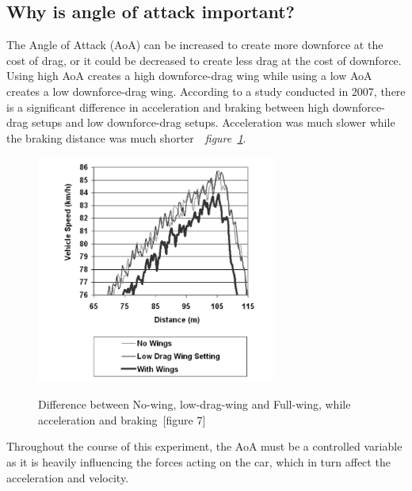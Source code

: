 \documentclass[11pt, a4paper]{article}
\begin{document}
\subsection{Why is angle of attack important?}
The Angle of Attack (AoA) can be increased to create more downforce at the cost of drag, or it could be decreased to create less drag at the cost of downforce. Using high AoA creates a high downforce-drag wing while using a low AoA creates a low downforce-drag wing.
According to a study conducted in 2007\cite{SAE}, there is a significant difference in acceleration and braking between high downforce-drag setups and low downforce-drag setups.
Acceleration was much slower while the braking distance was much shorter~\cite{SAE}~\textit{figure~\ref{fig:SAE}}.
\begin{figure}[H]
    \caption{Difference between No-wing, low-drag-wing and Full-wing, while acceleration and braking~\cite{SAE}[figure 7]} 
    \centering 
    \includegraphics[width=0.7\textwidth]{images/SAE_fig_7.png}
~\label{fig:SAE}
\end{figure} 
Throughout the course of this experiment, the AoA must be a controlled variable as it is heavily influencing the forces acting on the car, which in turn affect the acceleration and velocity.




\newpage{}
\end{document}
